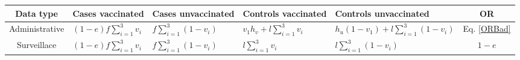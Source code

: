 \begin{tabular}{cp{7em}p{7em}p{6.5em}p{6.5em}c}
\toprule
Data type & Cases vaccinated & Cases unvaccinated & Controls vaccinated & Controls unvaccinated & OR \\
\midrule
Administrative & $(1-e) f \sum_{i=1}^3 v_i$ & $f \sum_{i=1}^3 (1-v_i)$ & $v_1h_v+l \sum_{i=1}^3 v_i$ & $h_u(1-v_1) + l\sum_{i=1}^3(1-v_i)$ & Eq. \ref{ORBad} \\[30pt]
Surveillace & $(1-e)f \sum_{i=1}^3 v_i$ & $f \sum_{i=1}^3 (1-v_i)$ & $l \sum_{i=1}^3 v_i$ & $l\sum_{i=1}^3(1-v_i)$ & $1-e$ \\
\bottomrule
\end{tabular}
